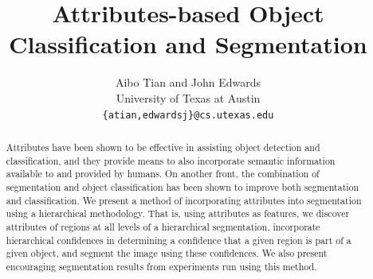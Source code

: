 \documentclass[10pt,twocolumn,letterpaper]{article}
\begin{document}
\title{Attributes-based Object Classification and Segmentation}

\author{Aibo Tian and John Edwards\\
University of Texas at Austin\\
{\tt\small \{atian,edwardsj\}@cs.utexas.edu}
}

\maketitle
\thispagestyle{empty}

\begin{abstract}
Attributes have been shown to be effective in assisting object detection and
classification, and they provide means to also incorporate semantic
information available to and provided by humans.  On another front, the
combination of segmentation and object classification has been shown to
improve both segmentation and classification.  We present a method of incorporating
attributes into segmentation using a hierarchical methodology.
That is, using attributes as features, we discover attributes of regions
at all levels of a hierarchical segmentation,
incorporate hierarchical confidences in determining a confidence that
a given region is part of a given object, and segment the image using
these confidences.  We also present encouraging segmentation results
from experiments run using this method.
\end{abstract}

\end{document}
